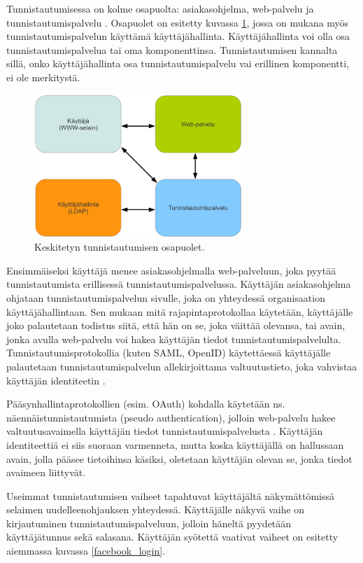 Tunnistautumisessa on kolme osapuolta: asiakasohjelma, web-palvelu ja tunnistautumispalvelu \cite{nisti}. Osapuolet on esitetty kuvassa \ref{composition}, jossa on mukana myös tunnistautumispalvelun käyttämä käyttäjähallinta. Käyttäjähallinta voi olla osa tunnistautumispalvelua tai oma komponenttinsa. Tunnistautumisen kannalta sillä, onko käyttäjähallinta osa tunnistautumispalvelu vai erillinen komponentti, ei ole merkitystä.

\begin{figure}[ht]
\centering
\includegraphics[width=0.7\textwidth]{teknologiat/composition.eps}
\caption{Keskitetyn tunnistautumisen osapuolet.}%
\label{composition}
\end{figure}

Ensimmäiseksi käyttäjä menee asiakasohjelmalla web-palveluun, joka pyytää tunnistautumista erillisessä tunnistautumispalvelussa. Käyttäjän asiakasohjelma ohjataan tunnistautumispalvelun sivulle, joka on yhteydessä organisaation käyttäjähallintaan. Sen mukaan mitä rajapintaprotokollaa käytetään, käyttäjälle joko palautetaan todistus siitä, että hän on se, joka väittää olevansa, tai avain, jonka avulla web-palvelu voi hakea käyttäjän tiedot tunnistautumispalvelulta. Tunnistautumisprotokollia (kuten SAML, OpenID) käytettäessä käyttäjälle palautetaan tunnistautumispalvelun allekirjoittama valtuutustieto, joka vahvistaa käyttäjän identiteetin \cite{nisti}.

Pääsynhallintaprotokollien (esim. OAuth) kohdalla käytetään ns. näennäistunnistautumista (pseudo authentication), jolloin web-palvelu hakee valtuutusavaimella käyttäjän tiedot tunnistautumispalvelusta \cite{distributed_web_security}. Käyttäjän identiteettiä ei siis suoraan varmenneta, mutta koska käyttäjällä on hallussaan avain, jolla pääsee tietoihinsa käsiksi, oletetaan käyttäjän olevan se, jonka tiedot avaimeen liittyvät.

Useimmat tunnistautumisen vaiheet tapahtuvat käyttäjältä näkymättömissä selaimen uudelleenohjauksen yhteydessä. Käyttäjälle näkyvä vaihe on kirjautuminen tunnistautumispalveluun, jolloin häneltä pyydetään käyttäjätunnus sekä salasana. Käyttäjän syötettä vaativat vaiheet on esitetty aiemmassa kuvassa \ref{facebook_login}.